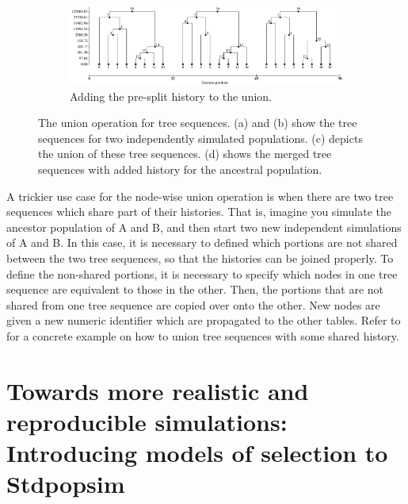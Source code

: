 \begin{figure}
\begin{subfigure}[b]{0.9\textwidth}
\includegraphics[width=\linewidth]{union_example/tsu_recap.pdf}
\caption{Adding the pre-split history to the union.}\label{fig:tsu_recap}
\end{subfigure}

\caption[The union operation for tree sequences]{The union operation for tree sequences.
(a) and (b) show the tree sequences for two independently simulated populations.
(c) depicts the union of these tree sequences.
(d) shows the merged tree sequences with added history for the ancestral population.}
\label{fig:union_op}
\end{figure}

A trickier use case for the node-wise union operation is when there are two tree sequences which share part of their histories.
That is, imagine you simulate the ancestor population of A and B, and then start two new independent simulations of A and B.
In this case, it is necessary to defined which portions are not shared between the two tree sequences,
so that the histories can be joined properly.
To define the non-shared portions, it is necessary to specify which nodes in one tree sequence are equivalent to those in the other.
Then, the portions that are not shared from one tree sequence are copied over onto the other.
New nodes are given a new numeric identifier which are propagated to the other tables.
Refer to \citet{rodrigues_vignette_2021} for a concrete example on how to union tree sequences with some shared history.

\section{Towards more realistic and reproducible simulations: Introducing models of selection to Stdpopsim}
